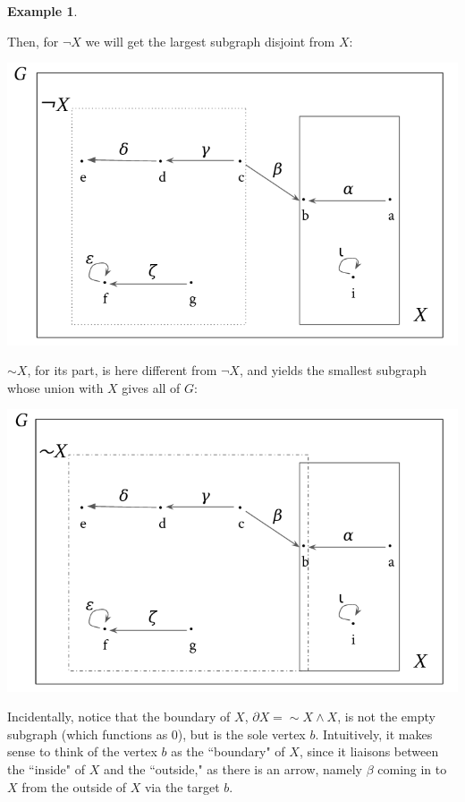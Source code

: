 \documentclass[11pt]{book}
\theoremstyle{definition}
\newtheorem{example}{Example}[section]
\theoremstyle{definition}
\theoremstyle{definition}
\theoremstyle{theorem}
\theoremstyle{definition}
\begin{document}
\begin{example}
\begin{center}
	\end{center}
	Then, for $\neg X$ we will get the largest subgraph disjoint from $X$:
	\begin{center}
		\includegraphics*[scale=0.25]{GraphSubgraphNegation2.png}
	\end{center}
	$\sim X$, for its part, is here different from $\neg X$, and yields the smallest subgraph whose union with $X$ gives all of $G$: 
	\begin{center}
		\includegraphics*[scale=0.25]{GraphSubgraphNegation3.png}
	\end{center}
	Incidentally, notice that the boundary of $X$, $\partial X = \sim X \wedge X$, is not the empty subgraph (which functions as $0$), but is the sole vertex $b$. Intuitively, it makes sense to think of the vertex $b$ as the ``boundary" of $X$, since it liaisons between the ``inside" of $X$ and the ``outside," as there is an arrow, namely $\beta$ coming in to $X$ from the outside of $X$ via the target $b$. 

\end{example}
\end{document}
